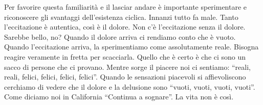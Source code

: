 Per favorire questa familiarità e il lasciar andare è importante sperimentare e riconoscere gli svantaggi dell'esistenza ciclica. Innanzi tutto fa male. Tanto l'eccitazione è autentica, così è il dolore. Non c'è l'eccitazione senza il dolore. Sarebbe bello, no? Quando il dolore arriva ci rendiamo conto che è vuoto. Quando l'eccitazione arriva, la sperimentiamo come assolutamente reale. Bisogna reagire veramente in fretta per scacciarla. Quello che è certo è che ci sono un sacco di persone che ci provano. Mentre sorge il piacere noi ci sentiamo: ``reali, reali, felici, felici, felici, felici''. Quando le sensazioni piacevoli si affievoliscono cerchiamo di vedere che il dolore e la delusione sono ``vuoti, vuoti, vuoti, vuoti''. Come diciamo noi in California ``Continua a sognare''. La vita non è così. 

